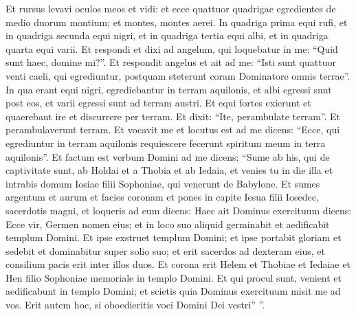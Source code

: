 \begin{biblechapter}
\begin{biblechapter}
\begin{biblechapter}
\begin{biblechapter}
\begin{biblechapter}
\begin{biblechapter}
\verse Et rursus levavi oculos meos et vidi: et ecce quattuor quadrigae egredientes de medio duorum montium; et montes, montes aerei. 
\verse In quadriga prima equi rufi, et in quadriga secunda equi nigri, 
\verse et in quadriga tertia equi albi, et in quadriga quarta equi varii. 
\verse Et respondi et dixi ad angelum, qui loquebatur in me: “Quid sunt haec, domine mi?”. 
\verse Et respondit angelus et ait ad me: “Isti sunt quattuor venti caeli, qui egrediuntur, postquam steterunt coram Dominatore omnis terrae”. 
\verse In qua erant equi nigri, egrediebantur in terram aquilonis, et albi egressi sunt post eos, et varii egressi sunt ad terram austri. 
\verse Et equi fortes exierunt et quaerebant ire et discurrere per terram. Et dixit: “Ite, perambulate terram”. Et perambulaverunt terram. 
\verse Et vocavit me et locutus est ad me dicens: “Ecce, qui egrediuntur in terram aquilonis requiescere fecerunt spiritum meum in terra aquilonis”.
 \verse Et factum est verbum Domini ad me dicens: 
\verse “Sume ab his, qui de captivitate sunt, ab Holdai et a Thobia et ab Iedaia, et venies tu in die illa et intrabis domum Iosiae filii Sophoniae, qui venerunt de Babylone. 
\verse Et sumes argentum et aurum et facies coronam et pones in capite Iesua filii Iosedec, sacerdotis magni, 
\verse et loqueris ad eum dicens: Haec ait Dominus exercituum dicens: Ecce vir, Germen nomen eius; et in loco suo aliquid germinabit et aedificabit templum Domini. 
\verse Et ipse exstruet templum Domini; et ipse portabit gloriam et sedebit et dominabitur super solio suo; et erit sacerdos ad dexteram eius, et consilium pacis erit inter illos duos. 
\verse Et corona erit Helem et Thobiae et Iedaiae et Hen filio Sophoniae memoriale in templo Domini. 
\verse Et qui procul sunt, venient et aedificabunt in templo Domini; et scietis quia Dominus exercituum misit me ad vos. Erit autem hoc, si oboedieritis voci Domini Dei vestri” ”.
 

\end{biblechapter}
\end{biblechapter}
\end{biblechapter}
\end{biblechapter}
\end{biblechapter}
\end{biblechapter}
